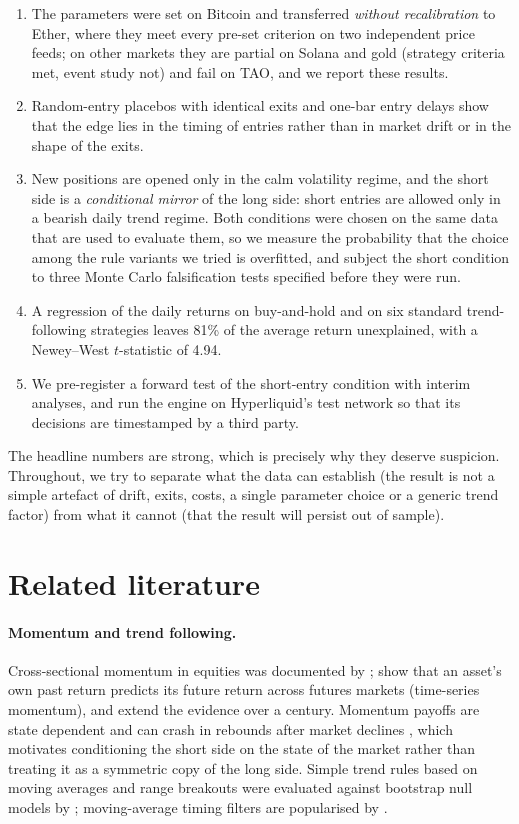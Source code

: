 \documentclass[11pt,a4paper]{article}
\newcommand{\1}{\mathbf{1}}
\begin{document}
\begin{enumerate}[label=(\roman*)]
\item The parameters were set on Bitcoin and transferred \emph{without recalibration} to Ether, where they meet every pre-set criterion on two independent price feeds; on other markets they are partial on Solana and gold (strategy criteria met, event study not) and fail on TAO, and we report these results.
\item Random-entry placebos with identical exits and one-bar entry delays show that the edge lies in the timing of entries rather than in market drift or in the shape of the exits.
\item New positions are opened only in the calm volatility regime, and the short side is a \emph{conditional mirror} of the long side: short entries are allowed only in a bearish daily trend regime. Both conditions were chosen on the same data that are used to evaluate them, so we measure the probability that the choice among the rule variants we tried is overfitted, and subject the short condition to three Monte Carlo falsification tests specified before they were run.
\item A regression of the daily returns on buy-and-hold and on six standard trend-following strategies leaves 81\% of the average return unexplained, with a Newey--West $t$-statistic of 4.94.
\item We pre-register a forward test of the short-entry condition with interim analyses, and run the engine on Hyperliquid's test network so that its decisions are timestamped by a third party.
\end{enumerate}

The headline numbers are strong, which is precisely why they deserve suspicion. Throughout, we try to separate what the data can establish (the result is not a simple artefact of drift, exits, costs, a single parameter choice or a generic trend factor) from what it cannot (that the result will persist out of sample).

\section{Related literature}

\paragraph{Momentum and trend following.} Cross-sectional momentum in equities was documented by \citet{JegadeeshTitman1993}; \citet{MoskowitzOoiPedersen2012} show that an asset's own past return predicts its future return across futures markets (time-series momentum), and \citet{HurstOoiPedersen2017} extend the evidence over a century. Momentum payoffs are state dependent and can crash in rebounds after market declines \citep{DanielMoskowitz2016}, which motivates conditioning the short side on the state of the market rather than treating it as a symmetric copy of the long side. Simple trend rules based on moving averages and range breakouts were evaluated against bootstrap null models by \citet{BrockLakonishokLeBaron1992}; moving-average timing filters are popularised by \citet{Faber2007}.
\end{document}
